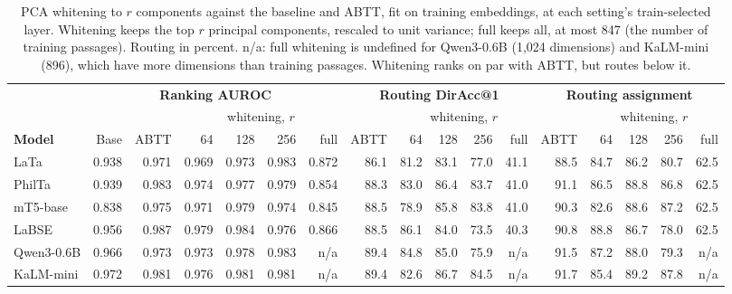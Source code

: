 \begin{table}[t]
\centering
\footnotesize
\setlength{\tabcolsep}{3.2pt}
\begin{tabular}{lrrrrrrrrrrrrrrrr}
\toprule
& \multicolumn{6}{c}{\textbf{Ranking AUROC}} & \multicolumn{5}{c}{\textbf{Routing DirAcc@1}} & \multicolumn{5}{c}{\textbf{Routing assignment}} \\
\cmidrule(lr){2-7}\cmidrule(lr){8-12}\cmidrule(lr){13-17}
& & & \multicolumn{4}{c}{whitening, $r$} & & \multicolumn{4}{c}{whitening, $r$} & & \multicolumn{4}{c}{whitening, $r$} \\
\cmidrule(lr){4-7}\cmidrule(lr){9-12}\cmidrule(lr){14-17}
\textbf{Model} & Base & ABTT & 64 & 128 & 256 & full & ABTT & 64 & 128 & 256 & full & ABTT & 64 & 128 & 256 & full \\
\midrule
LaTa & 0.938 & 0.971 & 0.969 & 0.973 & 0.983 & 0.872 & 86.1 & 81.2 & 83.1 & 77.0 & 41.1 & 88.5 & 84.7 & 86.2 & 80.7 & 62.5 \\
PhilTa & 0.939 & 0.983 & 0.974 & 0.977 & 0.979 & 0.854 & 88.3 & 83.0 & 86.4 & 83.7 & 41.0 & 91.1 & 86.5 & 88.8 & 86.8 & 62.5 \\
mT5-base & 0.838 & 0.975 & 0.971 & 0.979 & 0.974 & 0.845 & 88.5 & 78.9 & 85.8 & 83.8 & 41.0 & 90.3 & 82.6 & 88.6 & 87.2 & 62.5 \\
\midrule
LaBSE & 0.956 & 0.987 & 0.979 & 0.984 & 0.976 & 0.866 & 88.5 & 86.1 & 84.0 & 73.5 & 40.3 & 90.8 & 88.8 & 86.7 & 78.0 & 62.5 \\
Qwen3-0.6B & 0.966 & 0.973 & 0.973 & 0.978 & 0.983 & n/a & 89.4 & 84.8 & 85.0 & 75.9 & n/a & 91.5 & 87.2 & 88.0 & 79.3 & n/a \\
KaLM-mini & 0.972 & 0.981 & 0.976 & 0.981 & 0.981 & n/a & 89.4 & 82.6 & 86.7 & 84.5 & n/a & 91.7 & 85.4 & 89.2 & 87.8 & n/a \\
\bottomrule
\end{tabular}
\caption{PCA whitening to $r$ components against the baseline and ABTT, fit on training embeddings, at each setting's train-selected layer. Whitening keeps the top $r$ principal components, rescaled to unit variance; full keeps all, at most 847 (the number of training passages). Routing in percent. n/a: full whitening is undefined for Qwen3-0.6B (1,024 dimensions) and KaLM-mini (896), which have more dimensions than training passages. Whitening ranks on par with ABTT, but routes below it.}
\label{tab:whiten_reduced}
\end{table}
